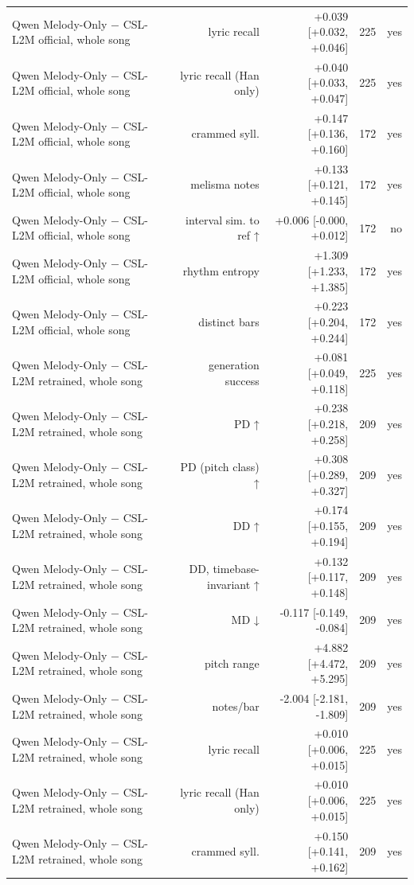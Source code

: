 \begin{table}[t]
\begin{tabular}{lrrrr}
Qwen Melody-Only $-$ CSL-L2M official, whole song & lyric recall & +0.039 [+0.032, +0.046] & 225 & yes \\
Qwen Melody-Only $-$ CSL-L2M official, whole song & lyric recall (Han only) & +0.040 [+0.033, +0.047] & 225 & yes \\
Qwen Melody-Only $-$ CSL-L2M official, whole song & crammed syll. & +0.147 [+0.136, +0.160] & 172 & yes \\
Qwen Melody-Only $-$ CSL-L2M official, whole song & melisma notes & +0.133 [+0.121, +0.145] & 172 & yes \\
Qwen Melody-Only $-$ CSL-L2M official, whole song & interval sim. to ref ↑ & +0.006 [-0.000, +0.012] & 172 & no \\
Qwen Melody-Only $-$ CSL-L2M official, whole song & rhythm entropy & +1.309 [+1.233, +1.385] & 172 & yes \\
Qwen Melody-Only $-$ CSL-L2M official, whole song & distinct bars & +0.223 [+0.204, +0.244] & 172 & yes \\
Qwen Melody-Only $-$ CSL-L2M retrained, whole song & generation success & +0.081 [+0.049, +0.118] & 225 & yes \\
Qwen Melody-Only $-$ CSL-L2M retrained, whole song & PD ↑ & +0.238 [+0.218, +0.258] & 209 & yes \\
Qwen Melody-Only $-$ CSL-L2M retrained, whole song & PD (pitch class) ↑ & +0.308 [+0.289, +0.327] & 209 & yes \\
Qwen Melody-Only $-$ CSL-L2M retrained, whole song & DD ↑ & +0.174 [+0.155, +0.194] & 209 & yes \\
Qwen Melody-Only $-$ CSL-L2M retrained, whole song & DD, timebase-invariant ↑ & +0.132 [+0.117, +0.148] & 209 & yes \\
Qwen Melody-Only $-$ CSL-L2M retrained, whole song & MD ↓ & -0.117 [-0.149, -0.084] & 209 & yes \\
Qwen Melody-Only $-$ CSL-L2M retrained, whole song & pitch range & +4.882 [+4.472, +5.295] & 209 & yes \\
Qwen Melody-Only $-$ CSL-L2M retrained, whole song & notes/bar & -2.004 [-2.181, -1.809] & 209 & yes \\
Qwen Melody-Only $-$ CSL-L2M retrained, whole song & lyric recall & +0.010 [+0.006, +0.015] & 225 & yes \\
Qwen Melody-Only $-$ CSL-L2M retrained, whole song & lyric recall (Han only) & +0.010 [+0.006, +0.015] & 225 & yes \\
Qwen Melody-Only $-$ CSL-L2M retrained, whole song & crammed syll. & +0.150 [+0.141, +0.162] & 209 & yes \\

\end{tabular}
\end{table}
